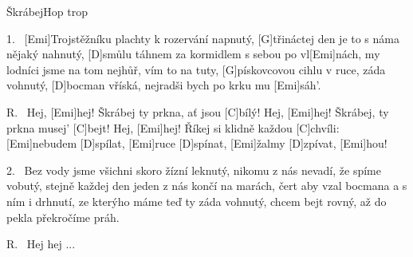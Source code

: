 \begin{song}{Škrábej}{Hop trop}

\begin{xverse}{1.~}
[\large Emi]Trojstěžníku plachty k rozervání napnutý,
[\large G]třináctej den je to s náma nějaký nahnutý,
[\large D]smůlu táhnem za kormidlem s sebou po vl[\large Emi]nách,
my lodníci jsme na tom nejhůř, vím to na tuty,
[\large G]pískovcovou cihlu v ruce, záda vohnutý,
[\large D]bocman vříská, nejradši bych po krku mu [\large Emi]sáh'.
\end{xverse}


\begin{xverse}{R.~}
Hej, [\large Emi]hej! Škrábej ty prkna, ať jsou [\large C]bílý!
Hej, [\large Emi]hej! Škrábej, ty prkna musej' [\large C]bejt!
Hej, [\large Emi]hej! Říkej si klidně každou [\large C]chvíli:
[\large Emi]nebudem [\large D]spílat, [\large Emi]ruce [\large D]spínat, [\large Emi]{}žalmy [\large D]zpívat, [\large Emi]hou!
\end{xverse}


\begin{xverse}{2.~}
Bez vody jsme všichni skoro žízní leknutý,
nikomu z nás nevadí, že spíme vobutý,
stejně každej den jeden z nás končí na marách,
čert aby vzal bocmana a s ním i drhnutí,
ze kterýho máme teď ty záda vohnutý,
chcem bejt rovný, až do pekla překročíme práh.
\end{xverse}


\begin{xverse}{R.~}
Hej hej ...
\end{xverse}

\end{song}

